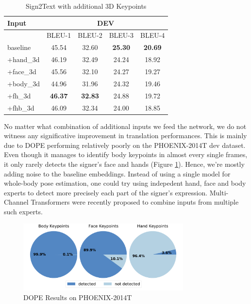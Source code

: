 \documentclass[final]{cvpr}
\begin{document}
\begin{table}[h]
	\centering
	\def\arraystretch{0.9}
	\begin{tabular}{l c c c c}
		\toprule
		Input &  \multicolumn{4}{c}{DEV}\\
		\midrule
		{}   & BLEU-1   & BLEU-2    & BLEU-3   & BLEU-4\\
		baseline  &  45.54 & 32.60  & \textbf{25.30}  & \textbf{20.69}\\
		+hand\_3d   &  46.19 & 32.49   & 24.24  & 18.92\\
		+face\_3d   &  45.56  &  32.10 & 24.27  & 19.27\\
		+body\_3d   &  44.96 &  31.96   & 24.32  & 19.46\\	
		+fh\_3d\footnotemark[3]  &  \textbf{46.37} &  \textbf{32.83}   & 24.88  & 19.72\\	
		+fhb\_3d\footnotemark[4]  &  46.09 &  32.34   & 24.00  & 18.85\\	
		\bottomrule
	\end{tabular}
	\caption{Sign2Text with additional 3D Keypoints}
	\label{tab:3d_keypoints}
\end{table}

No matter what combination of additional inputs we feed the network, we do not witness any significative improvement in translation performances. This is mainly due to DOPE performing relatively poorly on the PHOENIX-2014T dev dataset. Even though it manages to identify body keypoints in almost every single frames, it only rarely detects the signer's face and hands (Figure \ref{fig:pie_charts}). Hence, we're mostly adding noise to the baseline embeddings. 
Instead of using a single model for whole-body pose estimation, one could try using indepedent hand, face and body experts to detect more precisely each part of the signer's expression. Multi-Channel Transformers \cite{multi-channel} were recently proposed to combine inputs from multiple such experts.

\begin{figure}[t]
	\centering
	\includegraphics[width=8.7cm]{fig/keypoints.pdf}
	\caption{DOPE Results on  PHOENIX-2014T}
	\label{fig:pie_charts}
\end{figure} 
\end{document}
